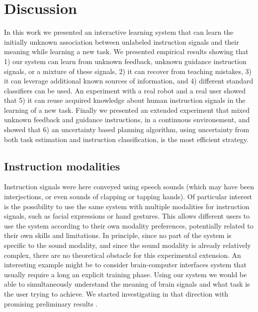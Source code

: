 \section{Discussion}

In this work we presented an interactive learning system that can learn the initially unknown association between unlabeled instruction signals and their meaning while learning a new task. We presented empirical results showing that 1) our system can learn from unknown feedback, unknown guidance instruction signals, or a mixture of these signals, 2) it can recover from teaching mistakes, 3) it can leverage additional known sources of information, and 4) different standard classifiers can be used. An experiment with a real robot and a real user showed that 5) it can reuse acquired knowledge about human instruction signals in the learning of a new task. Finally we presented an extended experiment that mixed unknown feedback and guidance instructions, in a continuous environement, and showed that 6) an uncertainty based planning algorithm, using uncertainty from both task estimation and instruction classification, is the most efficient strategy.

\subsection{Instruction modalities} Instruction signals were here conveyed using speech sounds (which may have been interjections, or even sounds of clapping or tapping hands). Of particular interest is the possibility to use the same system with multiple modalities for instruction signals, such as facial expressions or hand gestures. This allows different users to use the system according to their own modality preferences, potentially related to their own skills and limitations. In principle, since no part of the system is specific to the sound modality, and since the sound modality is already relatively complex, there are no theoretical obstacle for this experimental extension. An interesting example might be to consider brain-computer interfaces system \cite{chavarriaga2010learning, iturrate2010robot} that usually require a long an explicit training phase. Using our system we would be able to simultaneously understand the meaning of brain signals and what task is the user trying to achieve. We started investigating in that direction with promising preliminary results \cite{grizou2013zero}.




